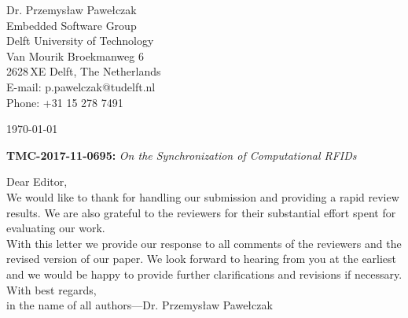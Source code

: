 \documentclass[10pt]{article}
\begin{document}
\pagestyle{myheadings}
\thispagestyle{empty}


\headsep 0.5cm

\bigskip\bigskip


\bigskip\bigskip

\begin{flushright}
Dr. Przemys{\l}aw Pawe{\l}czak \\
Embedded Software Group \\ 
Delft University of Technology \\ 
Van Mourik Broekmanweg 6\\
2628\,XE Delft, The Netherlands \\
E-mail: p.pawelczak@tudelft.nl\\
Phone: +31 15 278 7491\\
\end{flushright}

\vspace*{2cm}

\today
\medskip


\textbf{TMC-2017-11-0695:} {\sl On the Synchronization of Computational RFIDs}

\bigskip

Dear Editor,\\

We would like to thank for handling our submission and providing a rapid review results. We are also grateful to the reviewers for their substantial effort spent for evaluating our work. \\

With this letter we provide our response to all comments of the reviewers and the revised version of our paper. We look forward to hearing from you at the earliest and we would be happy to provide further clarifications and revisions if necessary. \\

With best regards, \\

in the name of all authors---Dr. Przemys{\l}aw Pawe{\l}czak

\pagebreak
\end{document}
